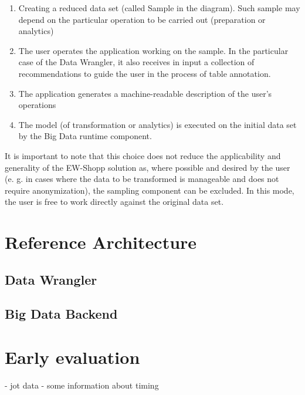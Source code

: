 \begin{enumerate}
    \item Creating a reduced data set (called Sample in the diagram). Such sample may depend on the particular operation to be carried out (preparation or analytics)
    \item 	The user operates the application working on the sample. In the particular case of the Data Wrangler, it also receives in input a collection of recommendations to guide the user in the process of table annotation.
    \item The application generates a machine-readable description of the user's operations
    \item The model (of transformation or analytics) is executed on the initial data set by the Big Data runtime component.
\end{enumerate}

It is important to note that this choice does not reduce the applicability and generality of the EW-Shopp solution as, where possible and desired by the user (e. g. in cases where the data to be transformed is manageable and does not require anonymization), the sampling component can be excluded. In this mode, the user is free to work directly against the original data set. 

\section{Reference Architecture}

\subsection{Data Wrangler}

\subsection{Big Data Backend}


\section{Early evaluation}

- jot data
- some information about timing

